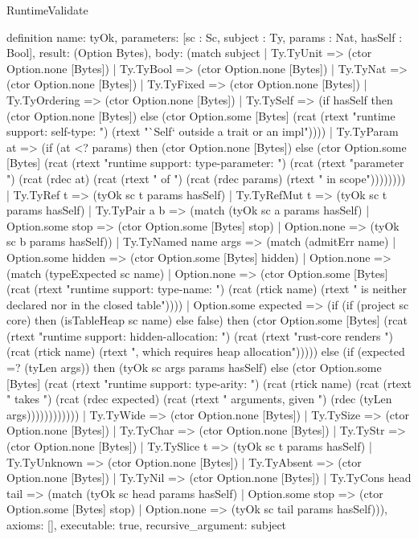 \begin{lexlean}{RuntimeValidate}
\begin{semanticmodule}
definition{
  name: tyOk,
  parameters: [sc : Sc, subject : Ty, params : Nat, hasSelf : Bool],
  result: (Option Bytes),
  body: (match subject
    | Ty.TyUnit => (ctor Option.none [Bytes])
    | Ty.TyBool => (ctor Option.none [Bytes])
    | Ty.TyNat => (ctor Option.none [Bytes])
    | Ty.TyFixed => (ctor Option.none [Bytes])
    | Ty.TyOrdering => (ctor Option.none [Bytes])
    | Ty.TySelf => (if hasSelf then (ctor Option.none [Bytes]) else (ctor Option.some [Bytes] (rcat (rtext "runtime support: self-type: ") (rtext "`Self` outside a trait or an impl"))))
    | Ty.TyParam at => (if (at <? params) then (ctor Option.none [Bytes]) else (ctor Option.some [Bytes] (rcat (rtext "runtime support: type-parameter: ") (rcat (rtext "parameter ") (rcat (rdec at) (rcat (rtext " of ") (rcat (rdec params) (rtext " in scope"))))))))
    | Ty.TyRef t => (tyOk sc t params hasSelf)
    | Ty.TyRefMut t => (tyOk sc t params hasSelf)
    | Ty.TyPair a b => (match (tyOk sc a params hasSelf)
      | Option.some stop => (ctor Option.some [Bytes] stop)
      | Option.none => (tyOk sc b params hasSelf))
    | Ty.TyNamed name args => (match (admitErr name)
      | Option.some hidden => (ctor Option.some [Bytes] hidden)
      | Option.none => (match (typeExpected sc name)
        | Option.none => (ctor Option.some [Bytes] (rcat (rtext "runtime support: type-name: ") (rcat (rtick name) (rtext " is neither declared nor in the closed table"))))
        | Option.some expected => (if (if (project sc core) then (isTableHeap sc name) else false) then (ctor Option.some [Bytes] (rcat (rtext "runtime support: hidden-allocation: ") (rcat (rtext "rust-core renders ") (rcat (rtick name) (rtext ", which requires heap allocation"))))) else (if (expected =? (tyLen args)) then (tyOk sc args params hasSelf) else (ctor Option.some [Bytes] (rcat (rtext "runtime support: type-arity: ") (rcat (rtick name) (rcat (rtext " takes ") (rcat (rdec expected) (rcat (rtext " arguments, given ") (rdec (tyLen args))))))))))))
    | Ty.TyWide => (ctor Option.none [Bytes])
    | Ty.TySize => (ctor Option.none [Bytes])
    | Ty.TyChar => (ctor Option.none [Bytes])
    | Ty.TyStr => (ctor Option.none [Bytes])
    | Ty.TySlice t => (tyOk sc t params hasSelf)
    | Ty.TyUnknown => (ctor Option.none [Bytes])
    | Ty.TyAbsent => (ctor Option.none [Bytes])
    | Ty.TyNil => (ctor Option.none [Bytes])
    | Ty.TyCons head tail => (match (tyOk sc head params hasSelf)
      | Option.some stop => (ctor Option.some [Bytes] stop)
      | Option.none => (tyOk sc tail params hasSelf))),
  axioms: [],
  executable: true,
  recursive_argument: subject
}


\end{semanticmodule}
\end{lexlean}
